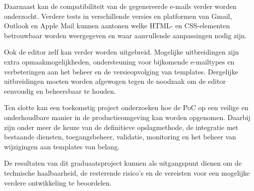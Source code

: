 Daarnaast kan de compatibiliteit van de gegenereerde e-mails verder worden
onderzocht. Verdere tests in verschillende versies en platformen van Gmail,
Outlook en Apple Mail kunnen aantonen welke HTML- en CSS-elementen
betrouwbaar worden weergegeven en waar aanvullende aanpassingen nodig zijn.

Ook de editor zelf kan verder worden uitgebreid. Mogelijke uitbreidingen
zijn extra opmaakmogelijkheden, ondersteuning voor bijkomende e-mailtypes
en verbeteringen aan het beheer en de versieopvolging van templates.
Dergelijke uitbreidingen moeten worden afgewogen tegen de noodzaak om de
editor eenvoudig en beheersbaar te houden.

Ten slotte kan een toekomstig project onderzoeken hoe de PoC op een veilige
en onderhoudbare manier in de productieomgeving kan worden opgenomen.
Daarbij zijn onder meer de keuze van de definitieve opslagmethode, de
integratie met bestaande diensten, toegangsbeheer, validatie, monitoring
en het beheer van wijzigingen aan templates van belang.

De resultaten van dit graduaatsproject kunnen als uitgangspunt dienen om
de technische haalbaarheid, de resterende risico's en de vereisten voor
een mogelijke verdere ontwikkeling te beoordelen.